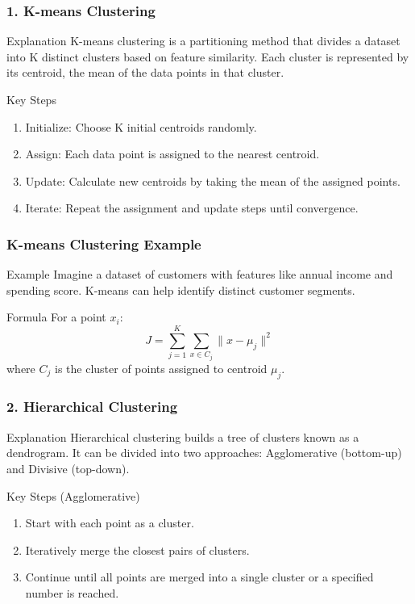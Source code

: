 \documentclass[aspectratio=169]{beamer}
\begin{document}
\begin{frame}[fragile]
    \frametitle{1. K-means Clustering}
    \begin{block}{Explanation}
        K-means clustering is a partitioning method that divides a dataset into K distinct clusters based on feature similarity. Each cluster is represented by its centroid, the mean of the data points in that cluster.
    \end{block}
    \begin{block}{Key Steps}
        \begin{enumerate}
            \item Initialize: Choose K initial centroids randomly.
            \item Assign: Each data point is assigned to the nearest centroid.
            \item Update: Calculate new centroids by taking the mean of the assigned points.
            \item Iterate: Repeat the assignment and update steps until convergence.
        \end{enumerate}
    \end{block}
\end{frame}

\begin{frame}[fragile]
    \frametitle{K-means Clustering Example}
    \begin{block}{Example}
        Imagine a dataset of customers with features like annual income and spending score. K-means can help identify distinct customer segments.
    \end{block}
    \begin{block}{Formula}
        For a point $x_i$:
        \begin{equation}
            J = \sum_{j=1}^{K} \sum_{x \in C_j} \| x - \mu_j \|^2
        \end{equation}
        where $C_j$ is the cluster of points assigned to centroid $\mu_j$.
    \end{block}
\end{frame}

\begin{frame}[fragile]
    \frametitle{2. Hierarchical Clustering}
    \begin{block}{Explanation}
        Hierarchical clustering builds a tree of clusters known as a dendrogram. It can be divided into two approaches: Agglomerative (bottom-up) and Divisive (top-down).
    \end{block}
    \begin{block}{Key Steps (Agglomerative)}
        \begin{enumerate}
            \item Start with each point as a cluster.
            \item Iteratively merge the closest pairs of clusters.
            \item Continue until all points are merged into a single cluster or a specified number is reached.
        \end{enumerate}
    \end{block}
\end{frame}
\end{document}

